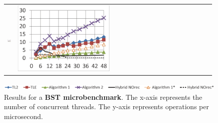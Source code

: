 \begin{figure}
\begin{minipage}{0.49\linewidth}
\begin{tabular}{m{0.05\linewidth}m{0.47\linewidth}m{0.47\linewidth}}
        \vspace{-5mm}\includegraphics[width=\linewidth]{figures/graphs/power8/5i5d10000k-nrq0.png} &
        \vspace{-5mm}\includegraphics[width=\linewidth]{figures/graphs/power8/5i5d10000k-nrq1.png}
        \\
    \end{tabular}
\end{minipage}
    \vspace{-2mm}
	\includegraphics[width=\linewidth]{figures/graphs/power8/dsbench3_legend_power.png}
    \vspace{-4mm}
\caption{Results for a \textbf{BST microbenchmark}.
The x-axis represents the number of concurrent threads.
The y-axis represents operations per microsecond.}
\label{fig-exp-bst}
\end{figure}

